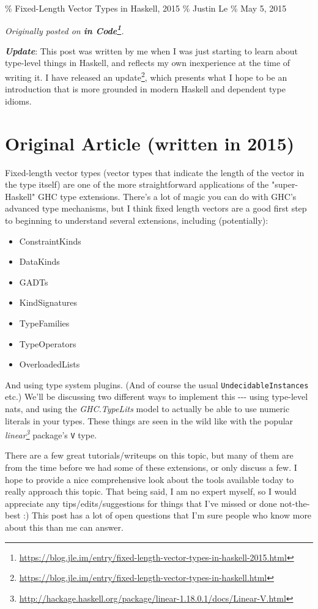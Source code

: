 \documentclass[]{article}
\renewcommand{\href}[2]{#2\footnote{\url{#1}}}
\begin{document}
\% Fixed-Length Vector Types in Haskell, 2015 \% Justin Le \% May 5, 2015

\emph{Originally posted on
\textbf{\href{https://blog.jle.im/entry/fixed-length-vector-types-in-haskell-2015.html}{in
Code}}.}

\textbf{\emph{Update}}: This post was written by me when I was just starting to
learn about type-level things in Haskell, and reflects my own inexperience at
the time of writing it. I have
\href{https://blog.jle.im/entry/fixed-length-vector-types-in-haskell.html}{released
an update}, which presents what I hope to be an introduction that is more
grounded in modern Haskell and dependent type idioms.

\section{Original Article (written in 2015)}

Fixed-length vector types (vector types that indicate the length of the vector
in the type itself) are one of the more straightforward applications of the
"super-Haskell" GHC type extensions. There's a lot of magic you can do with
GHC's advanced type mechanisms, but I think fixed length vectors are a good
first step to beginning to understand several extensions, including
(potentially):

\begin{itemize}
\tightlist
\item
  ConstraintKinds
\item
  DataKinds
\item
  GADTs
\item
  KindSignatures
\item
  TypeFamilies
\item
  TypeOperators
\item
  OverloadedLists
\end{itemize}

And using type system plugins. (And of course the usual
\texttt{UndecidableInstances} etc.) We'll be discussing two different ways to
implement this -\/-\/- using type-level nats, and using the \emph{GHC.TypeLits}
model to actually be able to use numeric literals in your types. These things
are seen in the wild like with the popular
\emph{\href{http://hackage.haskell.org/package/linear-1.18.0.1/docs/Linear-V.html}{linear}}
package's \texttt{V} type.

There are a few great tutorials/writeups on this topic, but many of them are
from the time before we had some of these extensions, or only discuss a few. I
hope to provide a nice comprehensive look about the tools available today to
really approach this topic. That being said, I am no expert myself, so I would
appreciate any tips/edits/suggestions for things that I've missed or done
not-the-best :) This post has a lot of open questions that I'm sure people who
know more about this than me can answer.
\end{document}
